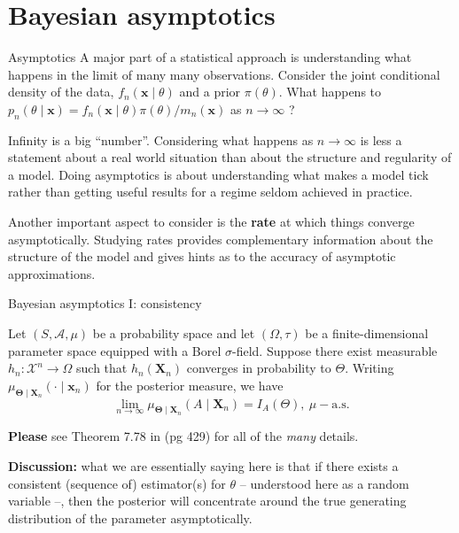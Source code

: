\section*{Bayesian asymptotics}
\begin{frame}{Asymptotics}
A major part of a statistical approach is understanding what happens in the limit of many many observations.
Consider the joint conditional density of the data, $f_n(\boldsymbol{x} \mid \theta)$ and a prior $\pi(\theta)$.
What happens to $p_n(\theta \mid \boldsymbol{x}) = f_n(\boldsymbol{x} \mid \theta)\pi(\theta)/m_n(\boldsymbol{x})$ as $n \to \infty$ ?
\begin{idea}
 Infinity is a big ``number''.
 Considering what happens  as $n \to \infty$ is less a statement about a real world situation than about the structure and regularity of a model.
 Doing asymptotics is about understanding what makes a model tick rather than getting useful results for a regime seldom achieved in practice.
\end{idea}
Another important aspect to consider is the \textbf{rate} at which things converge asymptotically.
Studying rates provides complementary information about the structure of the model and gives hints as to the accuracy of asymptotic approximations.
 \end{frame}
\begin{frame}{Bayesian asymptotics I: consistency}
\begin{theo}
Let $(S, \mathcal{A}, \mu)$ be a probability space and let $(\Omega, \tau)$ be a finite-dimensional parameter space equipped with a Borel $\sigma$-field.
Suppose there exist measurable $h_n: \mathcal{X}^n \to \Omega$ such that $h_n(\boldsymbol{X}_{n})$ converges in probability to $\Theta$.
Writing $\mu_{\boldsymbol{\Theta} \mid \boldsymbol{X}_{n}}(\cdot \mid \boldsymbol{x}_{n})$ for the posterior measure, we have
\begin{equation*}
 \lim_{n \to \infty} \mu_{\boldsymbol{\Theta} \mid \boldsymbol{X}_{n}}(A \mid \boldsymbol{X}_{n}) = I_A(\Theta), \: \mu-\textrm{a.s.}
\end{equation*}
\end{theo}
\textbf{Please} see Theorem 7.78 in \cite{Schervish1995} (pg 429) for all of the \textit{many} details.

\textbf{Discussion:} what we are essentially saying here is that if there exists a consistent (sequence of) estimator(s) for $\theta$ -- understood here as a random variable --, then the posterior will concentrate around the true generating distribution of the parameter asymptotically.
\end{frame}
